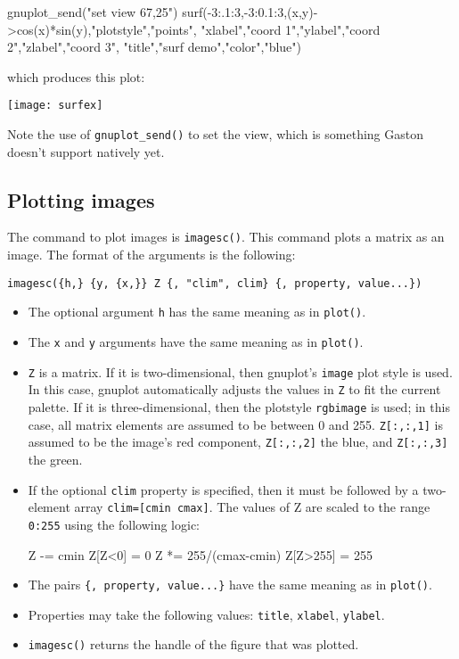 \documentclass[11pt]{article}
\newcommand{\cmd}[1]{\texttt{#1}}
\begin{document}
\begin{juliacode}
gnuplot_send("set view 67,25")
surf(-3:.1:3,-3:0.1:3,(x,y)->cos(x)*sin(y),"plotstyle","points",
"xlabel","coord 1","ylabel","coord 2","zlabel","coord 3",
"title","surf demo","color","blue")
\end{juliacode}

\noindent which produces this plot:

\begin{center}
\texttt{[image: surfex]}
\end{center}

Note the use of \cmd{gnuplot\_send()} to set the view, which is something Gaston
doesn't support natively yet.

\subsection{Plotting images}

The command to plot images is \cmd{imagesc()}. This command plots a matrix as an
image. The format of the arguments is the following:

\cmd{imagesc(\{h,\} \{y, \{x,\}\} Z \{, "clim", clim\} \{, property, value...\})}

\begin{itemize}
	\item The optional argument \cmd{h} has the same meaning as in
		\cmd{plot()}.
	\item The \cmd{x} and \cmd{y} arguments have the same meaning as in
		\cmd{plot()}.
	\item \cmd{Z} is a matrix. If it is two-dimensional, then gnuplot's
		\cmd{image} plot style is used. In this case, gnuplot
		automatically adjusts the values in \cmd{Z} to fit the current palette. If it is three-dimensional, then
		the plotstyle \cmd{rgbimage} is used; in this case, all matrix elements
		are assumed to be between 0 and 255. \cmd{Z[:,:,1]} is assumed to be
		the image's red component, \cmd{Z[:,:,2]} the blue, and \cmd{Z[:,:,3]}
		the green.
	\item If the optional \cmd{clim} property is specified, then it must be
		followed by a two-element
		array \cmd{clim=[cmin cmax]}. The values of Z
		are scaled to the range \cmd{0:255} using the following logic:
		\begin{juliacode}
Z -= cmin
Z[Z<0] = 0
Z *= 255/(cmax-cmin)
Z[Z>255] = 255
		\end{juliacode}
	\item The pairs \cmd{\{, property, value...\}} have the same meaning as in
		\cmd{plot()}.
	\item Properties may take the following values:
		\cmd{title}, \cmd{xlabel}, \cmd{ylabel}.
	\item \cmd{imagesc()} returns the handle of the figure that was plotted.
\end{itemize}
\end{document}
